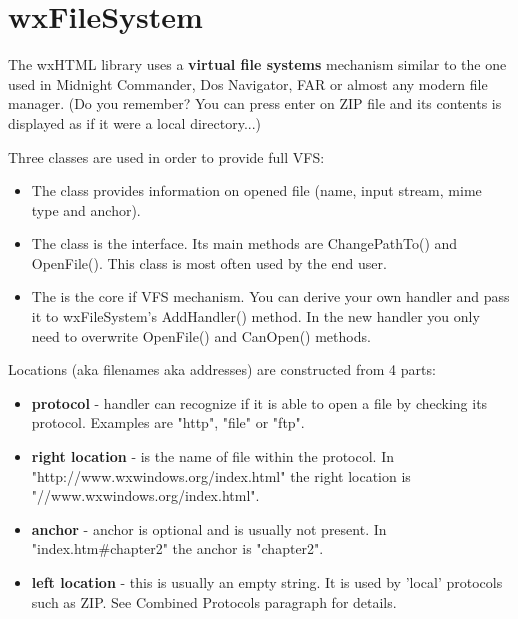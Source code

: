 \section{wxFileSystem}\label{fs}

The wxHTML library uses a {\bf virtual file systems} mechanism
similar to the one used in Midnight Commander, Dos Navigator,
FAR or almost any modern file manager. (Do you remember? You can
press enter on ZIP file and its contents is displayed as if it
were a local directory...)


Three classes are used in order to provide full VFS:

\begin{itemize}\itemsep=0pt
\item The  class provides information
on opened file (name, input stream, mime type and anchor).
\item The  class is the interface.
Its main methods are ChangePathTo() and OpenFile(). This class
is most often used by the end user.
\item The  is the core
if VFS mechanism. You can derive your own handler and pass it to
wxFileSystem's AddHandler() method. In the new handler you only need to
overwrite OpenFile() and CanOpen() methods.
\end{itemize}


Locations (aka filenames aka addresses) are constructed from 4 parts:

\begin{itemize}\itemsep=0pt
\item {\bf protocol} - handler can recognize if it is able to open a
file by checking its protocol. Examples are "http", "file" or "ftp".
\item {\bf right location} - is the name of file within the protocol.
In "http://www.wxwindows.org/index.html" the right location is "//www.wxwindows.org/index.html".
\item {\bf anchor} - anchor is optional and is usually not present.
In "index.htm\#chapter2" the anchor is "chapter2".
\item {\bf left location} - this is usually an empty string. 
It is used by 'local' protocols such as ZIP.
See Combined Protocols paragraph for details.
\end{itemize}

